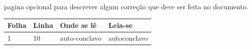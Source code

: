 \documentclass[
12pt,				%
openright,			%
twoside,			%
a4paper,			%
english,			%
french,				%
spanish,			%
brazil				%
]{abntex2}
\begin{document}
	\begin{errata}
		pagina opcional para descrever algum correção que deve ser feita no documento.
		
		\begin{table}[htb]
			\center
			\footnotesize
			\begin{tabular}{|p{1.4cm}|p{1cm}|p{3cm}|p{3cm}|}
				\hline
				\textbf{Folha} & \textbf{Linha}  & \textbf{Onde se lê}  & \textbf{Leia-se}  \\
				\hline
				1 & 10 & auto-conclavo & autoconclavo\\
				\hline
			\end{tabular}
		\end{table}
		
	\end{errata}
	
	
\end{document}
